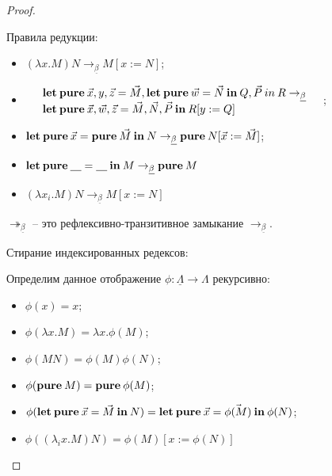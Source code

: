 \begin{proof}
\begin{defin} Правила редукции:

\begin{itemize}
\item $(\lambda x. M) N \rightarrow_{\underline{\beta}} M [x := N]$;
\item $\begin{array}{llll}
& {\bf let \: pure \:} \vec{x}, y, \vec{z} = \vec{M}, {\bf let \: pure \: } \vec{w} = \vec{N} {\bf \: in \: } Q, \vec{P} {\: in \:} R \rightarrow_{\underline{\beta}} & \\
& {\bf let \: pure \:} \vec{x}, \vec{w}, \vec{z} = \vec{M}, \vec{N}, \vec{P} \: { \bf in } \: R [y := Q]
\end{array}$;
\item ${\bf let \: pure \:} \vec{x} = {\bf pure \:} \vec{M} {\: \bf in \:} N \rightarrow_{\underline{\beta}} {\bf pure \:} N [\vec{x} := \vec{M}]$;
\item ${\bf let \: pure \:} \underline{\quad} = \underline {\quad} {\: \bf in \:} M \rightarrow_{\underline{\beta}} {\bf pure \:} M$
\item $(\lambda x_i. M) N \rightarrow_{\underline{\beta}} M [x := N]$
\end{itemize}
\end{defin}

$\twoheadrightarrow_{\underline{\beta}}$ -- это рефлексивно-транзитивное замыкание $\rightarrow_{\underline{\beta}}$.

\begin{defin} Стирание индексированных редексов:

Определим данное отображение $\phi : \underline{\Lambda} \to \Lambda$ рекурсивно:

\begin{itemize}
  \item $\phi(x) = x$;
  \item $\phi(\lambda x. M) = \lambda x. \phi(M)$;
  \item $\phi(M N) = \phi(M) \phi(N)$;
  \item $\phi({\bf pure \:} M) = {\bf pure \:} \phi(M)$;
  \item $\phi({\bf let \: pure \:} \vec{x} = \vec{M} {\: \bf in \:} N) = {\bf let \: pure \:} \vec{x} = \vec{\phi(M)} {\: \bf in \:} \phi(N)$;
  \item $\phi((\lambda_i x. M) N) = \phi(M) [x := \phi(N)]$
\end{itemize}
\end{defin}


\end{proof}

